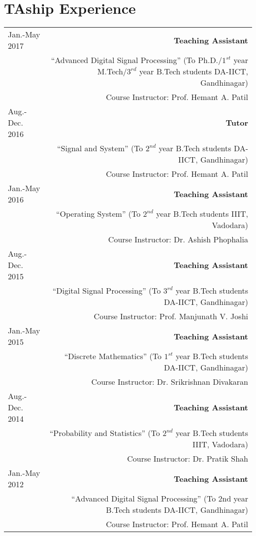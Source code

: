 \documentclass[10pt]{article}
\begin{document}
\section*{TAship Experience}
\begin{tabular}{L!{\VRule}R}
Jan.-May 2017&\textbf{Teaching Assistant}\\&``Advanced Digital Signal Processing'' (To Ph.D./$ 1^{st} $ year M.Tech/$ 3^{rd} $ year B.Tech students DA-IICT, Gandhinagar)\\& Course Instructor: Prof. Hemant A. Patil\vspace{0.2cm}\\
Aug.-Dec. 2016&\textbf{Tutor}\\&``Signal and System'' (To $ 2^{nd} $ year B.Tech students DA-IICT, Gandhinagar)\\& Course Instructor: Prof. Hemant A. Patil\vspace{0.2cm}\\
Jan.-May 2016&\textbf{Teaching Assistant}\\&``Operating System'' (To $ 2^{nd} $ year B.Tech students IIIT, Vadodara)\\& Course Instructor: Dr. Ashish Phophalia\vspace{0.2cm}\\
Aug.-Dec. 2015&\textbf{Teaching Assistant}\\&``Digital Signal Processing'' (To $ 3^{rd} $ year B.Tech students DA-IICT, Gandhinagar)\\& Course Instructor: Prof. Manjunath V. Joshi \vspace{0.2cm}\\
Jan.-May 2015&\textbf{Teaching Assistant}\\&``Discrete Mathematics'' (To $ 1^{st} $ year B.Tech students  DA-IICT, Gandhinagar)\\& Course Instructor: Dr. Srikrishnan Divakaran\vspace{0.2cm}\\
Aug.-Dec. 2014&\textbf{Teaching Assistant}\\&``Probability and Statistics'' (To $ 2^{nd} $ year B.Tech students IIIT, Vadodara)\\& Course Instructor: Dr. Pratik Shah\vspace{0.2cm}\\
Jan.-May 2012&\textbf{Teaching Assistant}\\&``Advanced Digital Signal Processing'' (To 2nd year B.Tech students DA-IICT, Gandhinagar)\\& Course Instructor: Prof. Hemant A. Patil\vspace{0.2cm}\\

\end{tabular}
\end{document}
